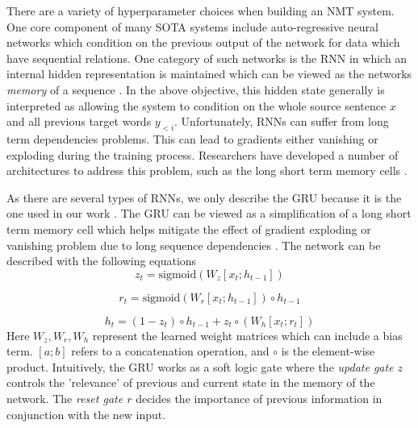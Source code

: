 There are a variety of hyperparameter choices when building an \ac{NMT} system. One core component of many \ac{SOTA} systems include auto-regressive neural networks which condition on the previous output of the network for data which have sequential relations. One category of such networks is the \ac{RNN} in which an internal hidden representation is maintained which can be viewed as the networks \textit{memory} of a sequence \cite{gravessupervisedSequenceRNNbook2012}. In the above objective, this hidden state generally is interpreted as allowing the system to condition on the whole source sentence $x$ and all previous target words $y_{<i}$. Unfortunately, \ac{RNN}s can suffer from long term dependencies problems. This can lead to gradients either vanishing or exploding during the training process. Researchers have developed a number of architectures to address this problem, such as the long short term memory cells \cite{gravessupervisedSequenceRNNbook2012}.

As there are several types of \ac{RNN}s, we only describe the \ac{GRU} because it is the one used in our work \cite{cho2014GRU}. The \ac{GRU} can be viewed as a simplification of a long short term memory cell which helps mitigate the effect of gradient exploding or vanishing problem due to long sequence dependencies \cite{gravessupervisedSequenceRNNbook2012}. The network can be described with the following equations
\begin{equation}
	z_{t} = \text{sigmoid}(W_{z}[x_{t}; h_{t-1} ] ) %
\end{equation}

\begin{equation} 
	r_{t} = \text{sigmoid}(W_{r} [x_{t}; h_{t-1}] )  \circ h_{t-1}%
\end{equation}

\begin{equation}
	h_{t} = (1 - z_{t}) \circ h_{t-1} + z_{t} \circ (W_{h} [x_{t}; r_{t} ]) %
\end{equation}
Here $W_{z}, W_{r}, W_{h}$ represent the learned weight matrices which can include a bias term.  $[a ; b]$ refers to a concatenation operation, and $\circ$ is the element-wise product. Intuitively, the \ac{GRU} works as a soft logic gate where the \textit{update gate $z$} controls the 'relevance' of previous and current state in the memory of the network. The \textit{reset gate $r$} decides the importance of previous information in conjunction with the new input. 

